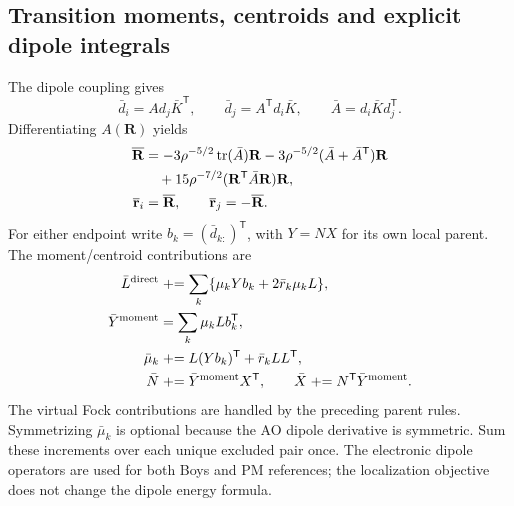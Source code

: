 \documentclass[11pt]{article}
\newcommand{\T}{^{\mathsf T}}
\begin{document}
\subsection{Transition moments, centroids and explicit dipole integrals}
The dipole coupling gives
\begin{equation}
 \bar d_i=A d_j\bar K\T,\qquad
 \bar d_j=A\T d_i\bar K,\qquad
 \bar A=d_i\bar K d_j\T.
\end{equation}
Differentiating $A(\mathbf R)$ yields
\begin{align}
 \overline{\mathbf R}
 &=-3\rho^{-5/2}\operatorname{tr}(\bar A)\mathbf R
   -3\rho^{-5/2}(\bar A+\bar A\T)\mathbf R\notag\\
 &\quad+15\rho^{-7/2}(\mathbf R\T\bar A\mathbf R)\mathbf R,\\
 \overline{\mathbf r}_i&=\overline{\mathbf R},\qquad
 \overline{\mathbf r}_j=-\overline{\mathbf R}.
 \label{eq:gradient-centroid-bar}
\end{align}
For either endpoint write $b_k=(\bar d_{k:})\T$, with $Y=NX$ for its
own local parent. The moment/centroid contributions are
\begin{align}
 \bar L^{\rm direct}&\mathrel{+}=\sum_k
       \{\mu_kYb_k+2\bar r_k\mu_kL\},\\
 \bar Y^{\rm moment}&=\sum_k\mu_kL b_k\T,\\
 \bar\mu_k&\mathrel{+}=L(Yb_k)\T+\bar r_kLL\T,\\
 \bar N&\mathrel{+}=\bar Y^{\rm moment}X\T,\qquad
 \bar X\mathrel{+}=N\T\bar Y^{\rm moment}.
 \label{eq:gradient-dipole-moment-bars}
\end{align}
The virtual Fock contributions are handled by the preceding parent rules.
Symmetrizing $\bar\mu_k$ is optional because the AO dipole derivative is
symmetric. Sum these increments over each unique excluded pair once.
The electronic dipole operators are used for both Boys and PM references;
the localization objective does not change the dipole energy formula.
\end{document}
